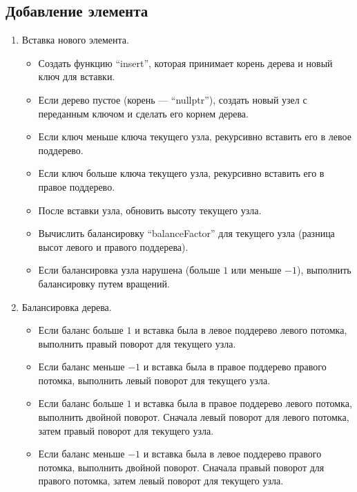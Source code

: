 \documentclass[12pt, a4paper]{article}
\begin{document}
\subsection{Добавление элемента}
\begin{enumerate}
    \item Вставка нового элемента.
    \begin{itemize}
        \item[---] Создать функцию ``insert'', которая принимает корень дерева и новый ключ для вставки.
        \item[---] Если дерево пустое (корень --- ``nullptr''), создать новый узел с переданным ключом и сделать его корнем дерева.
        \item[---] Если ключ меньше ключа текущего узла, рекурсивно вставить его в левое поддерево.
        \item[---] Если ключ больше ключа текущего узла, рекурсивно вставить его в правое поддерево.
        \item[---] После вставки узла, обновить высоту текущего узла.
        \item[---] Вычислить балансировку ``balanceFactor'' для текущего узла (разница высот левого и правого поддерева).
        \item[---] Если балансировка узла нарушена (больше $1$ или меньше $-1$), выполнить балансировку путем вращений. 
    \end{itemize}
    \item Балансировка дерева.
    \begin{itemize}
        \item[---] Если баланс больше $1$ и вставка была в левое поддерево левого потомка, выполнить правый поворот для текущего узла.
        \item[---] Если баланс меньше $-1$ и вставка была в правое поддерево правого потомка, выполнить левый поворот для текущего узла.
        \item[---] Если баланс больше $1$ и вставка была в правое поддерево левого потомка, выполнить двойной поворот. Сначала левый поворот для левого потомка, затем правый поворот для текущего узла.
        \item[---] Если баланс меньше $-1$ и вставка была в левое поддерево правого потомка, выполнить двойной поворот. Сначала правый поворот для правого потомка, затем левый поворот для текущего узла.
    \end{itemize}
\end{enumerate}
\end{document}
